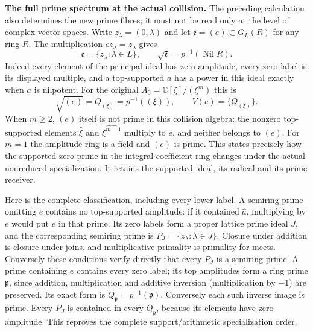 \documentclass[11pt,a4paper]{article}
\theoremstyle{definition}\newtheorem{definition}[theorem]{Definition}
\begin{document}
\HC\textbf{The full prime spectrum at the actual collision.}
The preceding calculation also determines the new prime fibres;
it must not be read only at the level of complex vector spaces.
Write $z_\lambda=(0,\lambda)$ and let
$\mathfrak e=(e)\subset G_L(R)$ for any ring $R$.
The multiplication $ez_\lambda=z_\lambda$ gives
\[
 \mathfrak e=\{z_\lambda:\lambda\in L\},\qquad
 \sqrt{\mathfrak e}=p^{-1}(\operatorname{Nil}R).
 \tag{HC27}
\]
Indeed every element of the principal ideal has zero amplitude,
every zero label is its displayed multiple, and a top-supported
$a$ has a power in this ideal exactly when $a$ is nilpotent.
For the original $A_0=\mathbb C[\xi]/(\xi^m)$ this is
\[
 \sqrt{(e)}=Q_{(\xi)}=p^{-1}((\xi)),
 \qquad V(e)=\{Q_{(\xi)}\}.
 \tag{HC28}
\]
When $m\ge2$, $(e)$ itself is not prime in this collision algebra:
the nonzero top-supported elements $\widehat\xi$ and
$\widehat{\xi^{m-1}}$ multiply to $e$, and neither belongs to $(e)$.
For $m=1$ the amplitude ring is a field and $(e)$ is prime.
This states precisely how the supported-zero prime in the integral
coefficient ring changes under the actual nonreduced specialization.
It retains the supported ideal, its radical and its prime receiver.

Here is the complete classification, including every lower label.
A semiring prime omitting $e$ contains no top-supported amplitude:
if it contained $\widehat a$, multiplying by $e$ would put $e$
in that prime. Its zero labels form a proper lattice prime ideal
$J$, and the corresponding semiring prime is
$P_J=\{z_\lambda:\lambda\in J\}$. Closure under addition is closure
under joins, and multiplicative primality is primality for meets.
Conversely these conditions verify directly that every $P_J$ is a
semiring prime. A prime containing $e$ contains every zero label;
its top amplitudes form a ring prime $\mathfrak p$, since addition,
multiplication and additive inversion (multiplication by $-1$)
are preserved. Its exact form is $Q_{\mathfrak p}=p^{-1}(\mathfrak p)$.
Conversely each such inverse image is prime. Every $P_J$ is contained
in every $Q_{\mathfrak p}$, because its elements have zero amplitude.
This reproves the complete support/arithmetic specialization order.
\end{document}
